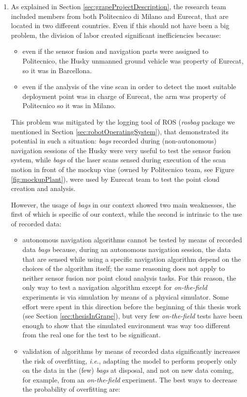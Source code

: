 \begin{enumerate}
	\item As explained in Section \ref{sec:grapeProjectDescription}, the research team included members from both Politecnico di Milano and Eurecat, that are located in two different countries. Even if this should not have been a big problem, the division of labor created significant inefficiencies because:
	\begin{itemize}
		\item even if the sensor fusion and navigation parts were assigned to Politecnico, the Husky unmanned ground vehicle was property of Eurecat, so it was in Barcellona.
		\item even if the analysis of the vine scan in order to detect the most suitable deployment point was in charge of Eurecat, the arm was property of Politecnico so it was in Milano.
	\end{itemize}
	This problem was mitigated by the logging tool of \ac{ROS} (\textit{rosbag} package we mentioned in Section \ref{sec:robotOperatingSystem}), that demonstrated its potential in such a situation: \textit{bags} recorded during (non-autonomous) navigation sessions of the Husky were very useful to test the sensor fusion system, while \textit{bags} of the laser scans sensed during execution of the scan motion in front of the mockup vine (owned by Politecnico team, see Figure \ref{fig:mockupPlant}), were used by Eurecat team to test the point cloud creation and analysis. 
\par However, the usage of \textit{bags} in our context showed two main weaknesses, the first of which is specific of our context, while the second is intrinsic to the use of recorded data:
\begin{itemize}
	\item autonomous navigation algorithms cannot be tested by means of recorded data \textit{bags} because, during an autonomous navigation session, the data that are sensed while using a specific navigation algorithm depend on the choices of the algorithm itself; the same reasoning does not apply to neither sensor fusion nor point cloud analysis tasks.
	For this reason, the only way to test a navigation algorithm except for \textit{on-the-field} experiments is via simulation by means of a physical simulator. Some effort were spent in this direction before the beginning of this thesis work (see Section \ref{sec:thesisInGrape}), but very few \textit{on-the-field} tests have been enough to show that the simulated environment was way too different from the real one for the test to be significant.
	\item validation of algorithms by means of recorded data significantly increases the risk of overfitting, \textit{i.e.}, adapting the model to perform properly only on the data in the (few) \textit{bags} at disposal, and not on new data coming, for example, from an \textit{on-the-field} experiment. The best ways to decrease the probability of overfitting are:

\end{itemize}
\end{enumerate}
